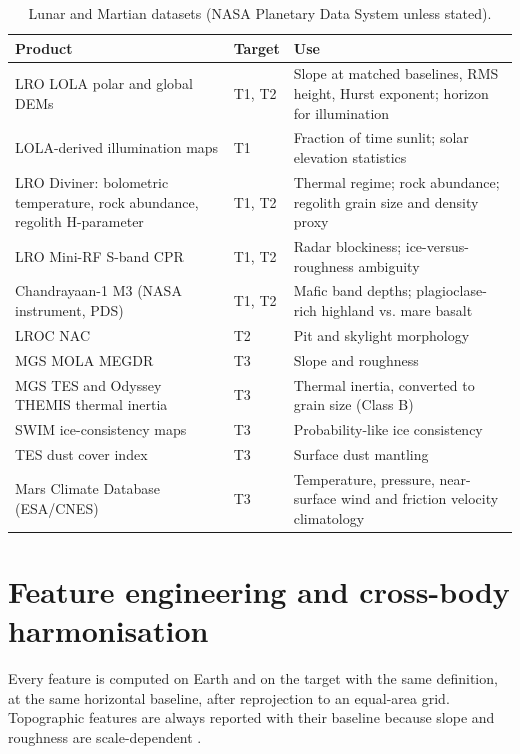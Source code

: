 \documentclass[11pt,a4paper]{article}
\begin{document}
\begin{table}[htbp]
\centering
\caption{Lunar and Martian datasets (NASA Planetary Data System unless stated).}
\label{tab:planetdata}
\small
\begin{tabular}{p{4.2cm}p{2.0cm}p{8.0cm}}
\toprule
Product & Target & Use \\
\midrule
LRO LOLA polar and global DEMs \citep{smith2010lola,rosenburg2011} & T1, T2 & Slope at matched baselines, RMS height, Hurst exponent; horizon for illumination \\
LOLA-derived illumination maps \citep{mazarico2011,glaser2014} & T1 & Fraction of time sunlit; solar elevation statistics \\
LRO Diviner: bolometric temperature, rock abundance, regolith H-parameter \citep{paige2010,hayne2017} & T1, T2 & Thermal regime; rock abundance; regolith grain size and density proxy \\
LRO Mini-RF S-band CPR \citep{spudis2013,fa2013} & T1, T2 & Radar blockiness; ice-versus-roughness ambiguity \\
Chandrayaan-1 M3 (NASA instrument, PDS) & T1, T2 & Mafic band depths; plagioclase-rich highland vs. mare basalt \\
LROC NAC & T2 & Pit and skylight morphology \\
MGS MOLA MEGDR & T3 & Slope and roughness \citep{kreslavsky2000} \\
MGS TES and Odyssey THEMIS thermal inertia \citep{mellon2000,putzig2007} & T3 & Thermal inertia, converted to grain size (Class B) \\
SWIM ice-consistency maps \citep{morgan2021,swimdata} & T3 & Probability-like ice consistency \\
TES dust cover index \citep{ruff2002} & T3 & Surface dust mantling \\
Mars Climate Database (ESA/CNES) \citep{forget1999} & T3 & Temperature, pressure, near-surface wind and friction velocity climatology \\
\bottomrule
\end{tabular}
\end{table}

\section{Feature engineering and cross-body harmonisation}

Every feature is computed on Earth and on the target with the same definition, at the same horizontal baseline, after reprojection to an equal-area grid. Topographic features are always reported with their baseline because slope and roughness are scale-dependent \citep{shepard2001}.
\end{document}
